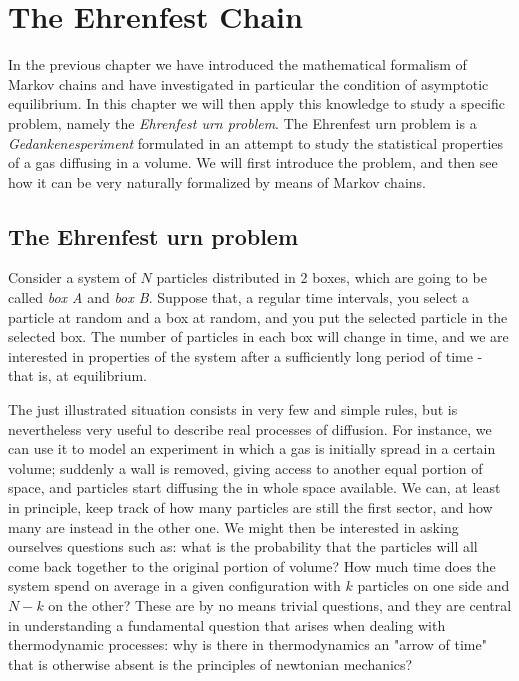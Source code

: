 \chapter{The Ehrenfest Chain}
In the previous chapter we have introduced the mathematical formalism of Markov chains and have investigated in particular the condition of asymptotic equilibrium. In this chapter we will then apply this knowledge to study a specific problem, namely the \emph{Ehrenfest urn problem}. The Ehrenfest urn problem is a \emph{Gedankenesperiment} formulated in an attempt to study the statistical properties of a gas diffusing in a volume. We will first introduce the problem, and then see how it can be very naturally formalized by means of Markov chains.

\section{The Ehrenfest urn problem}
Consider a system of $N$ particles distributed in 2 boxes, which are going to be called \emph{box A} and \emph{box B}. Suppose that, a regular time intervals, you select a particle at random and a box at random, and you put the selected particle in the selected box. The number of particles in each box will change in time, and we are interested in properties of the system after a sufficiently long period of time - that is, at equilibrium.

The just illustrated situation consists in very few and simple rules, but is nevertheless very useful to describe real processes of diffusion. For instance, we can use it to model an experiment in which a gas is initially spread in a certain volume; suddenly a wall is removed, giving access to another equal portion of space, and particles start diffusing the in whole space available. We can, at least in principle, keep track of how many particles are still the first sector, and how many are instead in the other one. We might then be interested in asking ourselves questions such as: what is the probability that the particles will all come back together to the original portion of volume? How much time does the system spend on average in a given configuration with $k$ particles on one side and $N - k$ on the other? These are by no means trivial questions, and they are central in understanding a fundamental question that arises when dealing with thermodynamic processes: why is there in thermodynamics an "arrow of time" that is otherwise absent is the principles of newtonian mechanics?

